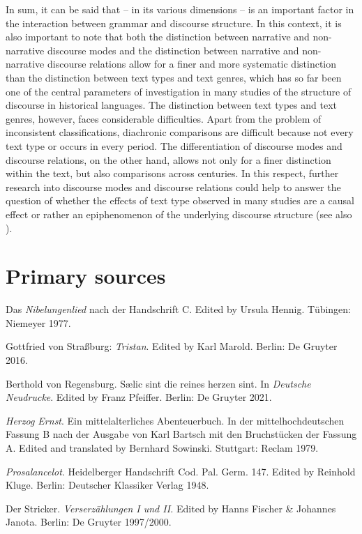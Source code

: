 \documentclass[output=paper,colorlinks,citecolor=brown]{langscibook}
\begin{document}
In sum, it can be said that  – in its various dimensions – is an important factor in the interaction between grammar and discourse structure. In this context, it is also important to note that both the distinction between narrative and non-narrative discourse modes and the distinction between narrative and non-narrative discourse relations allow for a finer and more systematic distinction than the distinction between text types and text genres, which has so far been one of the central parameters of investigation in many studies of the structure of discourse in historical languages. The distinction between text types and text genres, however, faces considerable difficulties. Apart from the problem of inconsistent classifications, diachronic comparisons are difficult because not every text type or  occurs in every period. The differentiation of discourse modes and discourse relations, on the other hand, allows not only for a finer distinction within the text, but also comparisons across centuries. In this respect, further research into discourse modes and discourse relations could help to answer the question of whether the effects of text type observed in many studies are a causal effect or rather an epiphenomenon of the underlying discourse structure (see also \citealt[2224]{Speyer2022}). 

\section*{Primary sources}
\begin{hangparas}{.25in}{1}
Das \textit{Nibelungenlied} nach der Handschrift C. Edited by Ursula Hennig. Tübingen: Niemeyer 1977.

Gottfried von Straßburg: \textit{Tristan}. Edited by Karl Marold. Berlin: De Gruyter 2016.

Berthold von Regensburg. Sælic sint die reines herzen sint. In \textit{Deutsche Neudrucke}. Edited by Franz Pfeiffer. Berlin: De Gruyter 2021.

\textit{Herzog Ernst}. Ein mittelalterliches Abenteuerbuch. In der mittelhochdeutschen Fassung B nach der Ausgabe von Karl Bartsch mit den Bruchstücken der Fassung A. Edited and translated by Bernhard Sowinski. Stuttgart: Reclam 1979.

\textit{Prosalancelot}. Heidelberger Handschrift Cod. Pal. Germ. 147. Edited by Reinhold Kluge. Berlin: Deutscher Klassiker Verlag 1948. 

Der Stricker. \textit{Verserzählungen I und II.} Edited by Hanns Fischer \& Johannes Janota. Berlin: De Gruyter 1997/2000.
\end{hangparas}


\bigskip



{\sloppy\printbibliography[heading=subbibliography,notkeyword=this]}
\end{document}
